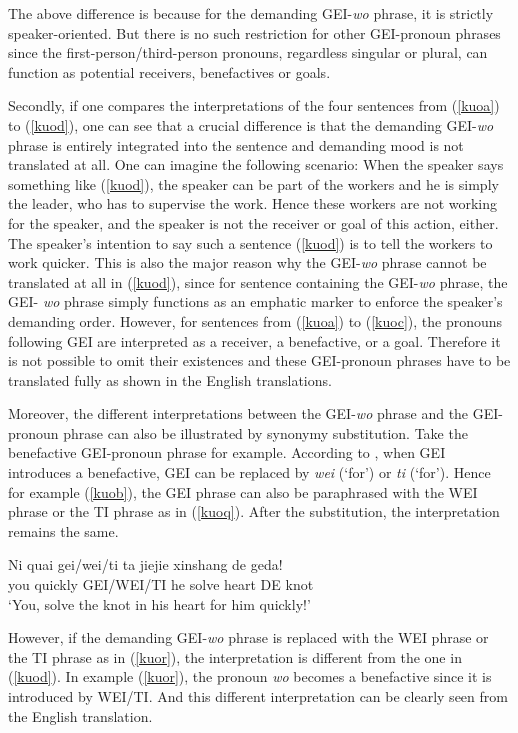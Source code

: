 \documentclass[output=paper,colorlinks,citecolor=brown]{langscibook}
\begin{document}
The above difference is because for the demanding GEI-\textit{wo} phrase, it is strictly speaker-oriented. But there is no such restriction for other GEI-pronoun phrases since the first-person/third-person pronouns, regardless singular or plural, can function as potential receivers, benefactives or goals.\par
Secondly, if one compares the interpretations of the four sentences from (\ref{kuoa}) to (\ref{kuod}), one can see that a crucial difference is that the demanding GEI-\textit{wo} phrase is entirely integrated into the sentence and demanding mood is not translated at all. One can imagine the following scenario: When the speaker says something like (\ref{kuod}), the speaker can be part of the workers and he is simply the leader, who has to supervise the work. Hence these workers are not working for the speaker, and the speaker is not the receiver or goal of this action, either. The speaker's intention to say such a sentence (\ref{kuod}) is to tell the workers to work quicker. This is also the major reason why the GEI-\textit{wo} phrase cannot be translated at all in (\ref{kuod}), since for sentence containing the GEI-\textit{wo} phrase, the GEI- \textit{wo} phrase simply functions as an emphatic marker to enforce the speaker's demanding order. However, for sentences from (\ref{kuoa}) to (\ref{kuoc}), the pronouns following GEI are interpreted as a receiver, a benefactive, or a goal. Therefore it is not possible to omit their existences and these GEI-pronoun phrases have to be translated fully as shown in the English translations.\par 
Moreover, the different interpretations between the GEI-\textit{wo} phrase and the GEI-pronoun phrase can also be illustrated by synonymy substitution. Take the benefactive GEI-pronoun phrase for example. According to \cite{Liu&Pan&Gu}, when GEI introduces a benefactive, GEI can be replaced by \textit{wei} (`for') or \textit{ti} (`for'). Hence for example (\ref{kuob}), the GEI phrase can also be paraphrased with the WEI phrase or the TI phrase as in (\ref{kuoq}). After the substitution, the interpretation remains the same.

\ea
\label{kuoq}
\gll Ni     quai    gei/wei/ti ta  jiejie  xinshang    de  geda!\\  
     you    quickly GEI/WEI/TI he  solve   heart       DE  knot\\ 
\glt `You, solve the knot in his heart for him quickly!'
\z

However, if the demanding GEI-\textit{wo} phrase is replaced with the WEI phrase or the TI phrase as in (\ref{kuor}), the interpretation is different from the one in (\ref{kuod}). In example (\ref{kuor}), the pronoun \textit{wo} becomes a benefactive since it is introduced by WEI/TI. And this different interpretation can be clearly seen from the English translation.
\end{document}
